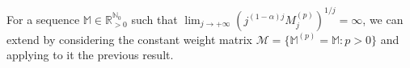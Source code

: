 \documentclass[11pt,a4paper]{article}
\theoremstyle{plain}
\theoremstyle{definition}
\newcommand{\RR}{\mathbb{R}}
\newcommand{\NN}{\mathbb{N}}
\newcommand{\M}{\mathbb{M}}
\let\on=\operatorname
\begin{document}
%
%
%

For a sequence $\M\in\RR_{>0}^{\NN_{0}}$ such that $\lim_{j\rightarrow+\infty}(j^{(1-\alpha)j}M^{(p)}_j)^{1/j}=\infty$, we can extend \cite[Thm. 1]{IderSiddiqi} by considering the constant weight matrix $\mathcal{M}=\{\M^{(p)}=\M: p>0\}$ and applying to it the previous result.
\end{document}
